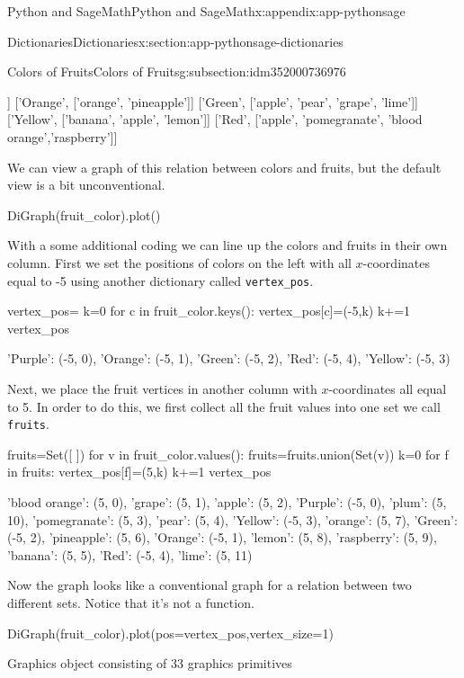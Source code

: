 \documentclass[oneside,10pt,]{book}
\newcommand{\mono}[1]{\texttt{#1}}
\begin{document}
\begin{appendixptx}{Python and SageMath}{}{Python and SageMath}{}{}{x:appendix:app-pythonsage}
\begin{sectionptx}{Dictionaries}{}{Dictionaries}{}{}{x:section:app-pythonsage-dictionaries}
\begin{subsectionptx}{Colors of Fruits}{}{Colors of Fruits}{}{}{g:subsection:idm352000736976}
\begin{sageoutput}
['Purple', ['plum', 'grape']]
['Orange', ['orange', 'pineapple']]
['Green', ['apple', 'pear', 'grape', 'lime']]
['Yellow', ['banana', 'apple', 'lemon']]
['Red', ['apple', 'pomegranate', 'blood orange','raspberry']]
\end{sageoutput}
We can view a graph of this relation between colors and fruits, but the default view is a bit unconventional.%
\begin{sageinput}
DiGraph(fruit_color).plot()
\end{sageinput}
\begin{sageoutput}

\end{sageoutput}
With a some additional coding we can line up the colors and fruits in their own column. First we set the positions of colors on the left with all \(x\)-coordinates equal to -5 using another dictionary called \mono{vertex\_pos}.%
\begin{sageinput}
vertex_pos={}
k=0
for c in fruit_color.keys():
    vertex_pos[c]=(-5,k)
    k+=1
vertex_pos
\end{sageinput}
\begin{sageoutput}
{'Purple': (-5, 0), 'Orange': (-5, 1), 'Green': (-5, 2), 'Red': (-5, 4), 'Yellow': (-5, 3)}
\end{sageoutput}
Next, we place the fruit vertices in another column with \(x\)-coordinates all equal to 5. In order to do this, we first collect all the fruit values into one set we call \mono{fruits}.%
\begin{sageinput}
fruits=Set([ ])
for v in fruit_color.values():
     fruits=fruits.union(Set(v))
k=0
for f in fruits:
    vertex_pos[f]=(5,k)
    k+=1
vertex_pos
\end{sageinput}
\begin{sageoutput}
{'blood orange': (5, 0), 'grape': (5, 1), 'apple': (5, 2), 'Purple': (-5, 0), 'plum': (5, 10), 'pomegranate': (5, 3), 'pear': (5, 4), 'Yellow': (-5, 3), 'orange': (5, 7), 'Green': (-5, 2), 'pineapple': (5, 6), 'Orange': (-5, 1), 'lemon': (5, 8), 'raspberry': (5, 9), 'banana': (5, 5), 'Red': (-5, 4), 'lime': (5, 11)}
\end{sageoutput}
Now the graph looks like a conventional graph for a relation between two different sets.  Notice that it's not a function.%
\begin{sageinput}
DiGraph(fruit_color).plot(pos=vertex_pos,vertex_size=1)
\end{sageinput}
\begin{sageoutput}
Graphics object consisting of 33 graphics primitives
\end{sageoutput}
\end{subsectionptx}
\end{sectionptx}
\end{appendixptx}
\end{document}
